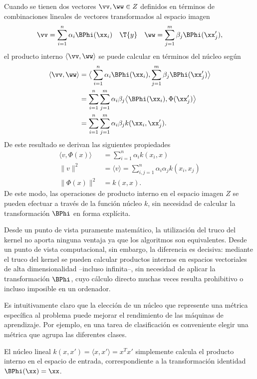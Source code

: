 Cuando se tienen dos vectores $\vv,\ww\in{}Z$ definidos en términos
de combinaciones lineales de vectores transformados al espacio imagen
%
\begin{align*}
  \vv=\sum_{i=1}^{n}\alpha_i\BPhi(\xx_i) \quad\T{ y }\quad
  \ww=\sum_{j=1}^{m}\beta_j\BPhi(\xx_j'),
\end{align*}
%
el producto interno $\langle\vv,\ww\rangle$ se puede calcular en
términos del núcleo según
%
\begin{align}
  \langle \vv,\ww\rangle&=\big\langle\sum_{i=1}^{n}\alpha_i\BPhi(\xx_i),
      \sum_{j=1}^{m}\beta_j\BPhi(\xx_j')\big\rangle \notag\\
    &=\sum_{i=1}^{n}\sum_{j=1}^{m}
      \alpha_i\beta_j\big\langle\BPhi(\xx_i),\Phi(\xx_j')\big\rangle\notag\\
    &=\sum_{i=1}^{n}\sum_{j=1}^{m} \alpha_i\beta_jk(\xx_i,\xx_j').
\end{align}
%
De este resultado se derivan las siguientes propiedades
%
\begin{align}
  \langle{}v,\Phi(x)\rangle &= \sum_{i=1}^{n}\alpha_ik(x_i,x) \\
  \|v\|^2 &= \langle{}v\rangle=\sum_{i,j=1}^n\alpha_i\alpha_jk(x_i,x_j)\\
  \|\Phi(x)\|^2 &=k(x,x).
\end{align}
%
De este modo, las operaciones de producto interno en el espacio imagen
$Z$ se pueden efectuar a través de la función núcleo $k$, sin necesidad
de calcular la transformación $\BPhi$ en forma explícita.

Desde un punto de vista puramente matemático, la utilización del truco
del kernel no aporta ninguna ventaja ya que los algoritmos son
equivalentes. Desde un punto de vista computacional, sin embargo, la
diferencia es decisiva: mediante el truco del kernel se pueden
calcular productos internos en espacios vectoriales de alta
dimensionalidad --incluso infinita--, sin necesidad de aplicar la
transformación $\BPhi$, cuyo cálculo directo muchas veces resulta
prohibitivo o incluso imposible en un ordenador.

Es intuitivamente claro que la elección de un núcleo que represente
una métrica específica al problema puede mejorar el rendimiento de las
máquinas de aprendizaje. Por ejemplo, en una tarea de clasificación es
conveniente elegir una métrica que agrupa las diferentes clases.

El núcleo lineal $k(x,x')=\langle{}x,x'\rangle=x^Tx'$ simplemente
calcula el producto interno en el espacio de entrada, correspondiente
a la transformación identidad $\BPhi(\xx)=\xx$.

